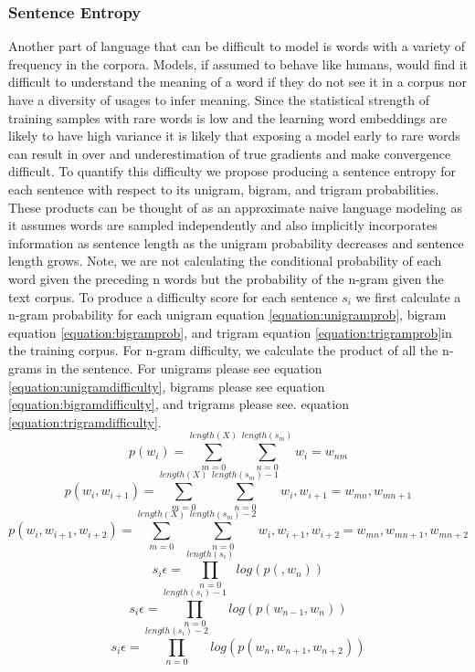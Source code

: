 \subsubsection{Sentence Entropy}
Another part of language that can be difficult to model is words with a variety of frequency in the corpora. Models, if assumed to behave like humans, would find it difficult to understand the meaning of a word if they do not see it in a corpus nor have a diversity of usages to infer meaning. Since the statistical strength of training samples with rare words is low and the learning word embeddings are likely to have high variance it is likely that exposing a model early to rare words can result in over and underestimation of true gradients and make convergence difficult. To quantify this difficulty we propose producing a sentence entropy for each sentence with respect to its unigram, bigram, and trigram probabilities. These products can be thought of as an approximate naive language modeling as it assumes words are sampled independently and also implicitly incorporates information as sentence length as the unigram probability decreases and sentence length grows. Note, we are not calculating the conditional probability of each word given the preceding n words but the probability of the n-gram given the text corpus. To produce a difficulty score for each sentence $s_i$ we first calculate a n-gram probability for each unigram equation \ref{equation:unigramprob}, bigram equation \ref{equation:bigramprob}, and trigram equation \ref{equation:trigramprob}in the training corpus. For n-gram difficulty, we calculate the product of all the n-grams in the sentence. For unigrams please see equation \ref{equation:unigramdifficulty}, bigrams please see  equation \ref{equation:bigramdifficulty}, and trigrams please see.  equation \ref{equation:trigramdifficulty}. 
\begin{equation}
    p(w_i) = \sum_{m=0} ^ {length(X)} \sum_{n=0}^{length(s_m)} w_i = w_{nm}
\label{equation:unigramprob}
\end{equation}
\begin{equation}
    p(w_{i}, w_{i+1}) = \sum_{m=0} ^ {length(X)} \sum_{n=0}^{length(s_m)-1} w_i, w_{i+1} = w_{mn},w_{mn+1}
\label{equation:bigramprob}
\end{equation}
\begin{equation}
    p(w_{i}, w_{i+1}, w_{i+2}) = \sum_{m=0} ^ {length(X)} \sum_{n=0}^{length(s_m)-2} w_i, w_{i+1},w_{i+2} = w_{mn},w_{mn+1},w_{mn+2}
\label{equation:trigramprob}
\end{equation}
\begin{equation}
   s_i\epsilon = \prod_{n=0}^{length(s_i)} log(p(, w_n))
\label{equation:unigramdifficulty}
\end{equation}
\begin{equation}
        s_i\epsilon = \prod_{n=0}^{length(s_i)-1} log(p(w_{n-1}, w_n))
\label{equation:bigramdifficulty}
\end{equation}
\begin{equation}
    s_i\epsilon = \prod_{n=0}^{length(s_i)-2} log(p(w_{n}, w_{n+1}, w_{n+2}))
\label{equation:trigramdifficulty}
\end{equation}
